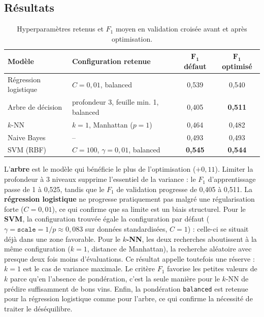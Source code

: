 \documentclass[11pt,a4paper]{article}
\newcommand{\code}[1]{\texttt{#1}}
\newcommand{\Fun}{F_1}
\begin{document}
\subsection{Résultats}

\begin{table}[H]
\centering
\caption{Hyperparamètres retenus et $\Fun$ moyen en validation croisée avant et après optimisation.}
\label{tab:optim}
\small
\begin{tabular}{llcc}
\toprule
\textbf{Modèle} & \textbf{Configuration retenue} & $\boldsymbol{\Fun}$ \textbf{défaut} & $\boldsymbol{\Fun}$ \textbf{optimisé} \\
\midrule
Régression logistique & $C=0{,}01$, balanced & 0,539 & 0,540 \\
Arbre de décision     & profondeur 3, feuille min. 1, balanced & 0,405 & \textbf{0,511} \\
$k$-NN                & $k=1$, Manhattan ($p=1$) & 0,464 & 0,482 \\
Naive Bayes           & -- & 0,493 & 0,493 \\
SVM (RBF)             & $C=100$, $\gamma=0{,}01$, balanced & \textbf{0,545} & \textbf{0,544} \\
\bottomrule
\end{tabular}
\end{table}

L'\textbf{arbre} est le modèle qui bénéficie le plus de l'optimisation ($+0{,}11$). Limiter la profondeur à 3 niveaux supprime l'essentiel de la variance : le $\Fun$ d'apprentissage passe de 1 à 0,525, tandis que le $\Fun$ de validation progresse de 0,405 à 0,511. La \textbf{régression logistique} ne progresse pratiquement pas malgré une régularisation forte ($C=0{,}01$), ce qui confirme que sa limite est un biais structurel. Pour le \textbf{SVM}, la configuration trouvée égale la configuration par défaut ($\gamma=\texttt{scale}=1/p\approx0{,}083$ sur données standardisées, $C=1$) : celle-ci se situait déjà dans une zone favorable. Pour le \textbf{$k$-NN}, les deux recherches aboutissent à la même configuration ($k=1$, distance de Manhattan), la recherche aléatoire avec presque deux fois moins d'évaluations. Ce résultat appelle toutefois une réserve : $k=1$ est le cas de variance maximale. Le critère $\Fun$ favorise les petites valeurs de $k$ parce qu'en l'absence de pondération, c'est la seule manière pour le $k$-NN de prédire suffisamment de bons vins. Enfin, la pondération \code{balanced} est retenue pour la régression logistique comme pour l'arbre, ce qui confirme la nécessité de traiter le déséquilibre.
\end{document}
